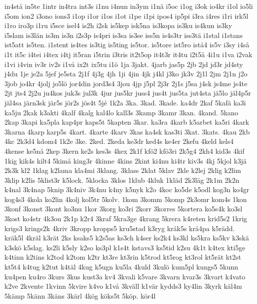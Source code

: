 {{in4st^^e5
in5te
1intr
in4tra
int3s
i1nu
i4nun
in3ym
i1n^^e4
i5oc
i1og
i3ok
io4kr
i1ol
io5li
i5om
ion2
i3ono
ions3
i1op
i1or
i1os
i1ot
i1pe
i1pi
ipos4
ip5pi
i3ra
i4res
i1ri
irk5l
i1ro
iro3p
i1ru
i5sce
isel4
is2h
i2sk
is5kep
isk5na
is3kopa
is3ku
is4kun
is3ky
i5slam
is3l^^e4n
is3m
is3n
i2s3p
is4pri
is3sa
is3se
iss5n
is4s3tr
iss3t^^e4
i1stal
i1stans
ist5att
is5ten.
i1stent
is4tes
is3tig
is5ting
is5tor.
is5tore
ist5ro
ist^^e54
is5v
i3sy
i4s^^e5
i1t
it5c
i4tei
i4tex
i4tj
it5ran
i5trin
i3tris
it2t5op
it4t3r
it4tu
i2t5^^e5
4i1u
i1va
i2vak
i1vi
i4vin
iv3r
iv2s
i1v^^e5
ix2t
ix5tu
i1^^f6
1ja
3jakt.
4jarb
jas5p
2jb
2jd
jd3r
jd4sty
j4du
1je
je2a
5jef
je5sta
2j1f
4j3g
4jh
1ji
4jin
4jk
j4kl
j3ko
jk3v
2j1l
2jm
2j1n
j2o
3job
jo4kr
4jolj
jo5l^^f6
jor4din
jord3s4
3jou
4jp
j5pl
2j3r
2j1s
j5sa
j4sk
js4me
js4te
2jt
jts4
2j2u
ju4kos
juk3s
jul3k
4jur
jus5kr
juss4
jus4t
jus5ta
jut4sta
j^^e45lo
j^^e4l4p5r
j^^e4l4sa
j^^e4rn3sk
j^^e4r5s
j^^f6r2s
j^^f6s4t
5j^^e9
1k2a
3ka.
3kad.
3kade.
ka4dr
2kaf
5kaf^^e4
ka3i
ka5ju
2kak
k3akti
4kalf
4kalg
kal4lo
kall3s
3kamp
3kamr
3kan.
4kand.
5kano
2kap
3kapi
ka5pla
kap4pr
kaps5t
5kapten
3kar.
ka3ra
4karb
k5arbet
ka5ri
4kark
3karna
4karp
karp5s
4kart.
4karte
4karv
3kas
ka4sk
kas3ti
3kat.
3kats.
4kau
2kb
4kc
2k3d4
kdom4
1k2e
3ke.
2ked.
2keda
ke3dr
ked4s
ke4er
2kefu
4keld
kels4
4kense
ke5n^^e5
2kep
3kern
ke2s
kes3s
4kex
2k1f
kf^^f62
kf^^f63ri
2k5g4
2kh4
kid3s
4kif
1kig
kik4s
kilt4
5kim^^e5
king3r
4kinne
4kins
2kint
ki4nu
ki4tr
kiv3s
4kj
5kjol
k3j^^e4
2k3k
kl2
1klag
k2lama
kla4mi
3klang.
3klass
2klat
5klav
2kle
k2lej
2klig
k2lim
3klip
k2lis
5klist3r
k5lock.
5klocka
3klos
1klub
4kluk
1kl^^e4d
2k3l^^e4g
2k1m
2k2n
k4nal
3k4nap
5knip
3k4niv
3k4nu
k4ny
k5nyk
k2o
4koc
ko5de
k5odl
kog3n
ko4gr
kog4s3
4kola
ko2lin
4kolj
kol5tr
5kolv.
1kom
3komm
5komp
2k3omr
kom4s
1kon
3konf
3konst
3kont
ko3nu
1kor
3korg
ko3ri
2korr
3korres
5kortera
ko5s4k
ko3sl
3kost
ko4str
4k3ou
2k1p
k2r4
3kraf
5kra3ge
4krang
5krera
k4reten
krid5s2
1krig
krigs3
krings2k
4kriv
3kropp
kropps5
kru5stad
k3ryg
kr^^e5k5s
kr^^e54pa
k5r^^e4dd.
kr^^e4k5l
4kr^^e4l
k3r^^e4t
2ks
ksaks5
k2s5as
ks3ch
k4ser
ks2k4
ks3kl
ks5kra
ks5kv
k3sk^^e4
k3sk^^f6
k5slag.
ks2li
k5sly
k2so
ks3pl
k1s4t
kstavs3
ks5tid
k2su
4k1t
k4tex
kti5ge
k4tinn
k2tins
k2tod
k2tom
k2tr
kt3re
kt3rin
k5trod
kt5rog
kt3rol
kt5r^^e4t
kt2st
kt5t4
k4tug
k2tut
k4t^^e4l
4kug
k5ugn
ku5la
4kuld
3kul^^f6
kum5pl
kungs5
5kunn
ku4pen
ku4ro
3kurs
3kus
kust3a
kv4
3kvali
k5vare
3kvarn
kvar3s
3kvart
k4vato
k2ve
2kvente
1kvinn
5kvire
k4vo
k1v^^e5
3kv^^e4ll
k1v^^e4r
kydds3
ky4lin
3kyrk
k^^e4l4m
5k^^e4mp
5k^^e4nn
3k^^e4ns
3k^^e4rl
4k^^f6g
k^^f6ks5t
5k^^f6p.
k^^f6r4l
}}
